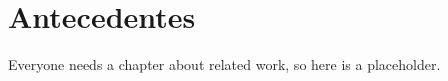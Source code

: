
\chapter{Antecedentes\label{ch:pastwork}}

Everyone needs a chapter about related work, so here is a placeholder.




